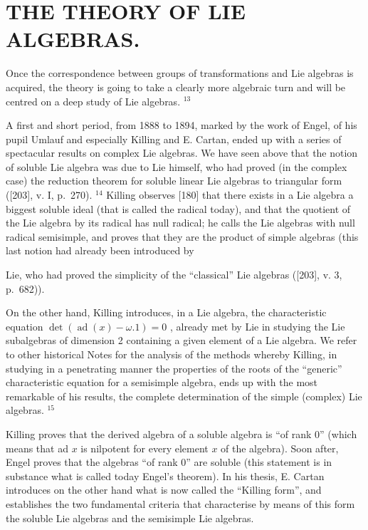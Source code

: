\section{THE THEORY OF LIE ALGEBRAS.}

Once the correspondence between groups of transformations and Lie algebras is acquired, the theory is going to take a clearly more algebraic turn and will be centred on a deep study of Lie algebras. \(^{13}\)

A first and short period, from 1888 to 1894, marked by the work of Engel, of his pupil Umlauf and especially Killing and E. Cartan, ended up with a series of spectacular results on complex Lie algebras. We have seen above that the notion of soluble Lie algebra was due to Lie himself, who had proved (in the complex case) the reduction theorem for soluble linear Lie algebras to triangular form ({[}203{]}, v. I, p.~270). \(^{14}\) Killing observes {[}180{]} that there exists in a Lie algebra a biggest soluble ideal (that is called the radical today), and that the quotient of the Lie algebra by its radical has null radical; he calls the Lie algebras with null radical semisimple, and proves that they are the product of simple algebras (this last notion had already been introduced by

Lie, who had proved the simplicity of the ``classical'' Lie algebras ({[}203{]}, v. 3, p.~682)).

On the other hand, Killing introduces, in a Lie algebra, the characteristic equation \(\det(\operatorname{ad}(x)-\omega.1)=0\) , already met by Lie in studying the Lie subalgebras of dimension 2 containing a given element of a Lie algebra. We refer to other historical Notes for the analysis of the methods whereby Killing, in studying in a penetrating manner the properties of the roots of the ``generic'' characteristic equation for a semisimple algebra, ends up with the most remarkable of his results, the complete determination of the simple (complex) Lie algebras. \(^{15}\)

Killing proves that the derived algebra of a soluble algebra is ``of rank 0'' (which means that ad \(x\) is nilpotent for every element \(x\) of the algebra). Soon after, Engel proves that the algebras ``of rank 0'' are soluble (this statement is in substance what is called today Engel's theorem). In his thesis, E. Cartan introduces on the other hand what is now called the ``Killing form'', and establishes the two fundamental criteria that characterise by means of this form the soluble Lie algebras and the semisimple Lie algebras.

